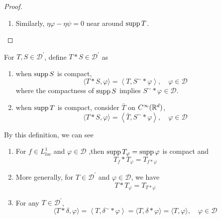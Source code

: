 \begin{enumerate}[label=\arabic*.]
\begin{proof}
\begin{enumerate}
			\item Similarly, $\eta \varphi-\eta \psi = 0$ near around $\operatorname{supp} T$.
		\end{enumerate}
	\end{proof}

	For $T,S \in \mathcal{D}^\prime$, define $T * S \in \mathcal{D}^\prime$ as
	\begin{enumerate}[label=(\arabic{*})]
		\item when $\operatorname{supp} S$ is compact, 
		\begin{equation*}
			\langle T * S, \varphi\rangle=\left\langle T, S^{\sim} * \varphi\right\rangle, \quad \varphi \in \mathcal{D}
		\end{equation*}
		where the compactness of $\operatorname{supp} S$ implies $S^\sim *\varphi \in \mathcal{D}$.

		\item when $\operatorname{supp} T$ is compact, consider $\bar{T}$ on $C^\infty(\mathbb{R}^d)$,
		\begin{equation*}
			\langle T * S, \varphi\rangle=\left\langle\bar{T}, S^{\sim} * \varphi\right\rangle, \quad \varphi \in \mathcal{D}
		\end{equation*}
	\end{enumerate}
	By this definition, we can see
	\begin{enumerate}[label=(\alph*)]
		\item For $f \in L^1_{loc}$ and $\varphi \in \mathcal{D}$ ,then $\operatorname{supp} T_\varphi = \operatorname{supp} \varphi$ is compact and
		\begin{equation*}
			T_f * T_\varphi = T_{f * \varphi}
		\end{equation*}

		\item More generally, for $T \in \mathcal{D}^\prime$ and $\varphi \in \mathcal{D}$, we have
		\begin{equation*}
			T * T_{\varphi} = T_{T *\varphi}
		\end{equation*}

		\item For any $T \in \mathcal{D}^\prime$,
		\begin{equation*}
			\langle T * \delta, \varphi\rangle=\left\langle T, \delta^{\sim} * \varphi\right\rangle=\langle T, \delta * \varphi\rangle=\langle T, \varphi\rangle,\quad \varphi \in \mathcal{D}
		\end{equation*}
	\end{enumerate}


\end{enumerate}
